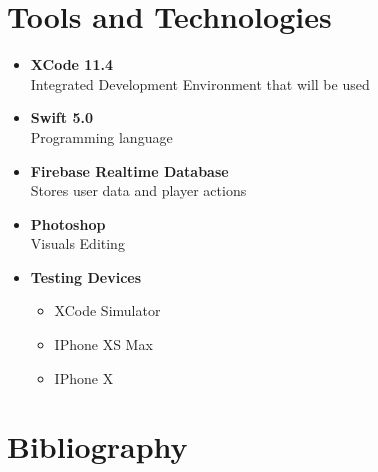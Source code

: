 \documentclass{article}
\begin{document}
\section{Tools and Technologies}
    \begin{itemize}
        \item \textbf{XCode 11.4}\\Integrated Development Environment that will be used
        \item \textbf{Swift 5.0}\\Programming language
        \item \textbf{Firebase Realtime Database}\\Stores user data and player actions
        \item \textbf{Photoshop}\\Visuals Editing
        
        \item \textbf{Testing Devices}
            \begin{itemize}
            \item XCode Simulator
            \item IPhone XS Max
            \item IPhone X
            \end{itemize}
    \end{itemize}


\section{Bibliography}
\end{document}
